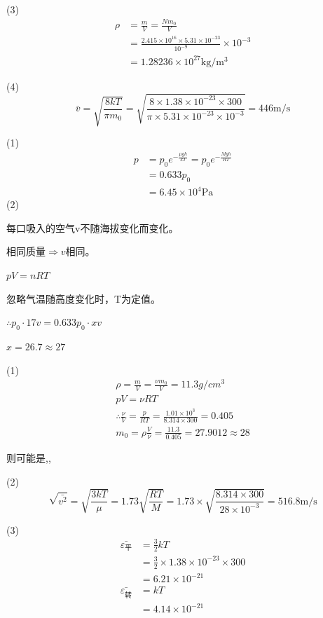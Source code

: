 (3)
\begin{align*}
\rho &= \frac { m } { V } = \frac { N m _ { 0 } } { V }\\
&= \frac { 2.415 \times 10 ^ { 16 } \times 5.31 \times 10 ^ { - 23 } } { 10 ^ { - 9 } } \times 10 ^ { - 3 } \\
&= 1.28236 \times 10 ^ { 27 } \mathrm { kg } / \mathrm {m^3}
\end{align*}

(4)
$$
\bar { v } = \sqrt { \frac { 8 k T } { \pi m _ { 0 } } } = \sqrt { \frac { 8 \times 1.38 \times 10 ^ { - 23 } \times 300 } { \pi \times 5.31 \times 10 ^ { - 23 } \times 10 ^ { - 3 } } } = 446 \mathrm { m } / \mathrm { s }
$$

\exercise

\solve
(1)
\begin{align*}
p &= p _ { 0 } e ^ { - \frac { \mu g h } { k T } } = p _ { 0 } e ^ { - \frac { M g h } { R T } } \\
&= 0.633 p _ { 0 } \\
&= 6.45 \times 10 ^4\mathrm{Pa}
\end{align*}
(2)

每口吸入的空气v不随海拔变化而变化。

相同质量$\Rightarrow v $相同。

$pV=nRT$

忽略气温随高度变化时，T为定值。

$\therefore p_{0}\cdot 17 v =0.633p_0 \cdot x v$

${ x = 26.7 \approx 27}$ 


\exercise

\solve
(1)
$$
\begin{array} { c } { \rho = \frac { m } { V } = \frac { \nu m _ { 0 } } { V } = 11.3 g / c m ^ { 3 } } \\ { p V = \nu R T } \\ { \therefore \frac { \nu } { V } = \frac { p } { R T } = \frac { 1.01 \times 10 ^ { 3 } } { 8.314 \times 300 } = 0.405 } \\ { m _ { 0 } = \rho \frac { V } { \nu } = \frac { 11.3 } { 0.405 } = 27.9012 \approx 28 } \end{array}
$$

则可能是,,

(2)
$$
\sqrt{\bar{v^{2}}}=\sqrt {\frac{3kT}{\mu}}=1.73\sqrt {\frac{RT}{M}}=1.73\times\sqrt{\frac{8.314\times 300}{28\times10^{-3}}}=516.8\mathrm{m}/\mathrm{s}
$$

(3)
\begin{align*}
\bar{\varepsilon_{\mbox{平}}}&=\frac{3}{2}kT\\
&=\frac{3}{2}\times 1.38\times 10^{-23}\times 300\\
&=6.21\times 10^{-21}\\
\bar{\varepsilon_{\mbox{转}}}&=kT\\
&=4.14\times 10^{-21}
\end{align*}

